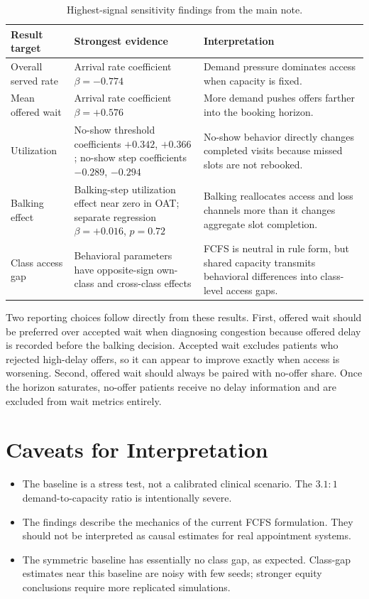\documentclass[11pt]{article}
\begin{document}
\begin{table}[h]
\centering
\small
\renewcommand{\arraystretch}{1.12}
\begin{tabularx}{\textwidth}{L{0.23\textwidth}L{0.31\textwidth}Y}
\toprule
Result target & Strongest evidence & Interpretation \\
\midrule
Overall served rate & Arrival rate coefficient \(\beta=-0.774\) & Demand pressure dominates access when capacity is fixed. \\
Mean offered wait & Arrival rate coefficient \(\beta=+0.576\) & More demand pushes offers farther into the booking horizon. \\
Utilization & No-show threshold coefficients \(+0.342\), \(+0.366\); no-show step coefficients \(-0.289\), \(-0.294\) & No-show behavior directly changes completed visits because missed slots are not rebooked. \\
Balking effect & Balking-step utilization effect near zero in OAT; separate regression \(\beta=+0.016\), \(p=0.72\) & Balking reallocates access and loss channels more than it changes aggregate slot completion. \\
Class access gap & Behavioral parameters have opposite-sign own-class and cross-class effects & FCFS is neutral in rule form, but shared capacity transmits behavioral differences into class-level access gaps. \\
\bottomrule
\end{tabularx}
\caption{Highest-signal sensitivity findings from the main note.}
\end{table}

Two reporting choices follow directly from these results. First, offered wait
should be preferred over accepted wait when diagnosing congestion because
offered delay is recorded before the balking decision. Accepted wait excludes
patients who rejected high-delay offers, so it can appear to improve exactly
when access is worsening. Second, offered wait should always be paired with
no-offer share. Once the horizon saturates, no-offer patients receive no delay
information and are excluded from wait metrics entirely.

\section{Caveats for Interpretation}

\begin{itemize}
  \item The baseline is a stress test, not a calibrated clinical scenario. The
  \(3.1{:}1\) demand-to-capacity ratio is intentionally severe.
  \item The findings describe the mechanics of the current FCFS formulation.
  They should not be interpreted as causal estimates for real appointment
  systems.
  \item The symmetric baseline has essentially no class gap, as expected.
  Class-gap estimates near this baseline are noisy with few seeds; stronger
  equity conclusions require more replicated simulations.
\end{itemize}
\end{document}
